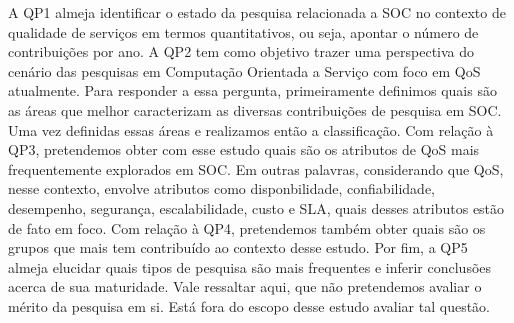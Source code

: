 A QP1 almeja identificar o estado da pesquisa relacionada a SOC no contexto de qualidade de servi\c{c}os em termos quantitativos, ou seja, apontar o n\'{u}mero de contribui\c{c}\~{o}es por ano. A QP2 tem como objetivo trazer uma perspectiva do cen\'{a}rio das pesquisas em Computa\c{c}\~{a}o Orientada a Servi\c{c}o com foco em QoS atualmente. Para responder a essa pergunta, primeiramente definimos quais s\~{a}o as \'{a}reas que melhor caracterizam as diversas contribui\c{c}\~{o}es de pesquisa em SOC. Uma vez definidas essas \'{a}reas e realizamos ent\~{a}o a classifica\c{c}\~{a}o. Com rela\c{c}\~{a}o \`{a} QP3, pretendemos obter com esse estudo quais s\~{a}o os atributos de QoS mais frequentemente explorados em SOC. Em outras palavras, considerando que QoS, nesse contexto, envolve atributos como disponbilidade, confiabilidade, desempenho, seguran\c{c}a, escalabilidade, custo e SLA, quais desses atributos est\~{a}o de fato em foco. Com rela\c{c}\~{a}o \`{a} QP4, pretendemos tamb\'{e}m obter quais s\~{a}o os grupos que mais tem contribu\'{i}do ao contexto desse estudo. Por fim, a QP5 almeja elucidar quais tipos de pesquisa s\~{a}o mais frequentes e inferir conclusões acerca de sua maturidade. Vale ressaltar aqui, que n\~{a}o pretendemos avaliar o m\'{e}rito da pesquisa em si. Est\'{a} fora do escopo desse estudo avaliar tal quest\~{a}o.


